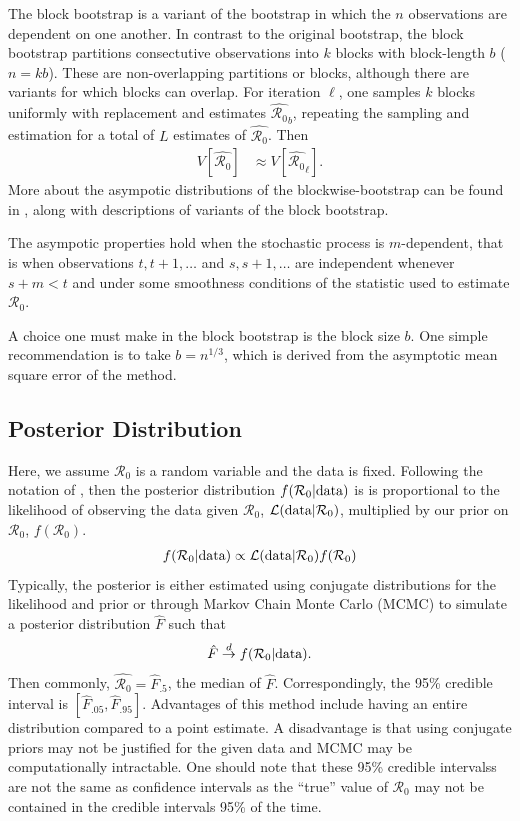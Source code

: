 \documentclass[12pt]{article}
\newcommand{\rr}{\ensuremath{\mathcal{R}_0}}
\begin{document}
The block bootstrap is a variant of the bootstrap in which the $n$ observations are dependent on one another.  In contrast to the original bootstrap, the block bootstrap partitions consectutive observations into $k$ blocks with block-length $b$ ($n=kb$).  These are non-overlapping partitions or blocks, although there are variants for which blocks can overlap.  For iteration $\ell$, one samples $k$ blocks uniformly with replacement and estimates $\hat{\rr}_b$, repeating the sampling and estimation for a total of $L$ estimates of $\hat{\rr}$.  Then
\begin{align*}
  V\left [ \hat{\rr} \right ] &\approx V\left [\hat{\rr}_\ell \right ].
\end{align*}
More about the asympotic distributions of the blockwise-bootstrap can be found in \cite{cao1999}, along with descriptions of variants of the block bootstrap.

The asympotic properties hold when the stochastic process is $m$-dependent, that is when observations $t, t+1, \dots$ and $s, s+1, \dots$ are independent whenever $s+m < t$ and under some smoothness conditions of the statistic used to estimate $\rr$.

A choice one must make in the block bootstrap is the block size $b$.  One simple recommendation is to take $b= n^{1/3}$, which is derived from the asymptotic mean square error of the method.


\subsection{Posterior Distribution}
Here, we assume $\rr$ is a random variable and the data is fixed.  Following the notation of \cite{wasserman2004}, then the posterior distribution $f(\rr | \textnormal{data})$ is is proportional to the likelihood of observing the data given $\rr$, $\mathcal{L}(\textnormal{data}|\rr)$, multiplied by our prior on $\rr$, $f(\rr)$. 
\begin{align*}
f(\rr | \textnormal{data} ) \propto \mathcal{L}(\textnormal{data} | \rr) f(\rr)
\end{align*}
 Typically, the posterior is either estimated using conjugate distributions for the likelihood and prior or through Markov Chain Monte Carlo (MCMC) to simulate a posterior distribution $\hat{F}$ such that
\begin{align*}
\hat{F} \overset{d}{\to} f(\rr| \textnormal{data}).
\end{align*}
Then commonly, $\hat{\rr} = \hat{F}_{.5}$, the median of $\hat{F}$.  Correspondingly, the 95\% credible interval is $\left[\hat{F}_{.05}, \hat{F}_{.95} \right ]$. Advantages of this method include having an entire distribution compared to a point estimate.  A disadvantage is that using conjugate priors may not be justified for the given data and MCMC may be computationally intractable.  One should note that these 95\% credible intervalss are not the same as confidence intervals as the ``true'' value of $\rr$ may not be contained in the credible intervals 95\% of the time.
\end{document}
